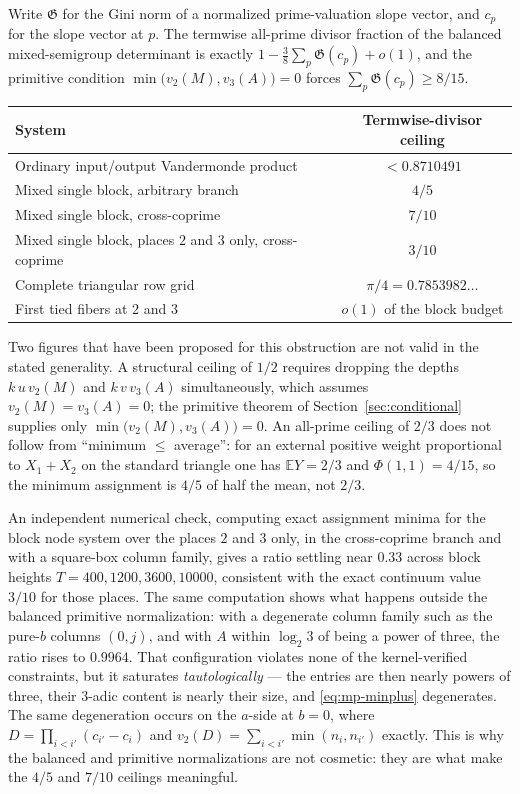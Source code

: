 \documentclass[11pt,oneside]{article}
\theoremstyle{definition}
\theoremstyle{remark}
\newcommand{\vpp}[2]{v_{#1}\!\left(#2\right)}
\begin{document}
Write $\mathfrak G$ for the Gini norm of a normalized prime-valuation slope vector, and $c_p$
for the slope vector at $p$.  The termwise all-prime divisor fraction of the balanced
mixed-semigroup determinant is exactly $1-\tfrac38\sum_p\mathfrak G(c_p)+o(1)$, and the
primitive condition $\min\bigl(\vpp2M,\vpp3A\bigr)=0$ forces $\sum_p\mathfrak G(c_p)\ge8/15$.

\begin{center}
\begin{tabular}{lc}
\toprule
System & Termwise-divisor ceiling \\
\midrule
Ordinary input/output Vandermonde product & $<0.8710491$ \\
Mixed single block, arbitrary branch & $4/5$ \\
Mixed single block, cross-coprime & $7/10$ \\
Mixed single block, places $2$ and $3$ only, cross-coprime & $3/10$ \\
Complete triangular row grid & $\pi/4=0.7853982\ldots$ \\
First tied fibers at $2$ and $3$ & $o(1)$ of the block budget \\
\bottomrule
\end{tabular}
\end{center}

Two figures that have been proposed for this obstruction are not valid in the stated
generality.  A structural ceiling of $1/2$ requires dropping the depths $k\,u\,\vpp2M$ and
$k\,v\,\vpp3A$ simultaneously, which assumes $\vpp2M=\vpp3A=0$; the primitive theorem of
Section~\ref{sec:conditional} supplies only $\min\bigl(\vpp2M,\vpp3A\bigr)=0$.  An all-prime
ceiling of $2/3$ does not follow from ``minimum $\le$ average'': for an external positive weight
proportional to $X_1+X_2$ on the standard triangle one has $\mathbb E Y=2/3$ and
$\Phi(1,1)=4/15$, so the minimum assignment is $4/5$ of half the mean, not $2/3$.

An independent numerical check, computing exact assignment minima for the block node system
over the places $2$ and $3$ only, in the cross-coprime branch and with a square-box column
family, gives a ratio settling near $0.33$ across block heights $T=400,1200,3600,10000$,
consistent with the exact continuum value $3/10$ for those places.  The same computation shows
what happens outside the balanced primitive normalization: with a degenerate column family such
as the pure-$b$ columns $(0,j)$, and with $A$ within $\log_2 3$ of being a power of three, the
ratio rises to $0.9964$.  That configuration violates none of the kernel-verified constraints,
but it saturates \emph{tautologically} --- the entries are then nearly powers of three, their
$3$-adic content is nearly their size, and \eqref{eq:mp-minplus} degenerates.  The same
degeneration occurs on the $a$-side at $b=0$, where $D=\prod_{i<i'}(c_{i'}-c_i)$ and
$v_2(D)=\sum_{i<i'}\min(n_i,n_{i'})$ exactly.  This is why the balanced and primitive
normalizations are not cosmetic: they are what make the $4/5$ and $7/10$ ceilings meaningful.
\end{document}
